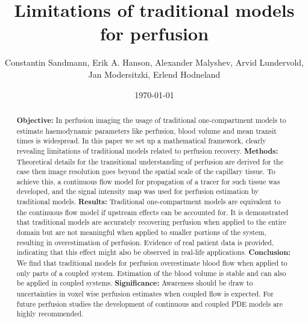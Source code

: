 \documentclass[journal,twocolumn]{IEEEtran}
\title{Limitations of traditional models for perfusion}
\author{Constantin Sandmann, Erik A. Hanson, Alexander Malyshev,  Arvid Lundervold, Jan Modersitzki, Erlend Hodneland }
\date{\today}
\begin{document}
	\maketitle

	\begin{abstract}
		\textbf{Objective:}
		In perfusion imaging the usage of traditional one-compartment models to estimate haemodynamic parameters like perfusion, blood volume and mean transit times is widespread. In this paper we set up a mathematical framework, clearly revealing limitations of traditional models related to perfusion recovery.
		\textbf{Methods:}
		Theoretical details for the transitional understanding of perfusion are derived for the case then image resolution goes beyond the spatial scale of the capillary tissue. 
		To achieve this, a continuous flow model for propagation of a tracer for such tissue was developed, and the signal intensity map was used for perfusion estimation by traditional models.
		\textbf{Results:}
		Traditional one-compartment models are equivalent to the continuous flow model if upstream effects can be accounted for.
		It is demonstrated that traditional models are accurately recovering perfusion when applied to the entire domain but are not meaningful when applied to smaller portions of the system, resulting in overestimation of perfusion.
		Evidence of real patient data is provided, indicating that this effect might also be observed in real-life applications.
		\textbf{Conclusion:}
		We find that traditional models for perfusion overestimate blood flow when applied to only parts of a coupled system. Estimation of the blood volume is stable and can also be applied in coupled systems.
		\textbf{Significance:}
		Awareness should be draw to uncertainties in voxel wise perfusion estimates when coupled flow is expected. For future perfusion studies the development of continuous and coupled PDE models are highly recommended.
	\end{abstract}

\end{document}
